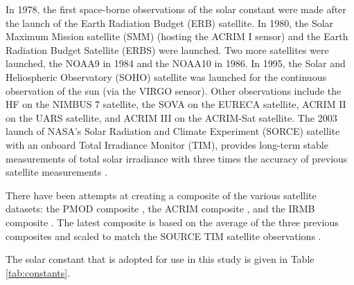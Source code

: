 In 1978, the first space-borne observations of the solar constant were made after the launch of the Earth Radiation Budget (ERB) satellite.  
In 1980, the Solar Maximum Mission satellite (SMM) (hosting the ACRIM I sensor) and the Earth Radiation Budget Satellite (ERBS) were launched. 
Two more satellites were launched, the NOAA9 in 1984 and the NOAA10 in 1986.  
In 1995, the Solar and Heliospheric Observatory (SOHO) satellite was launched for the continuous observation of the sun (via the VIRGO sensor). 
Other observations include the HF on the NIMBUS 7 satellite, the SOVA on the EURECA satellite, ACRIM II on the UARS satellite, and ACRIM III on the ACRIM-Sat satellite. 
The 2003 launch of NASA's Solar Radiation and Climate Experiment (SORCE) satellite with an onboard Total Irradiance Monitor (TIM), provides long-term stable measurements of total solar irradiance with three times the accuracy of previous satellite measurements \parencite{kopp11}.

There have been attempts at creating a composite of the various satellite datasets: the PMOD composite \parencite{frohlich06}, the ACRIM composite \parencite{willson97}, and the IRMB composite \parencite{dewitte04}. 
The latest composite is based on the average of the three previous composites and scaled to match the SOURCE TIM satellite observations \parencite{kopp11}.

The solar constant that is adopted for use in this study is given in Table \ref{tab:constants}.  

